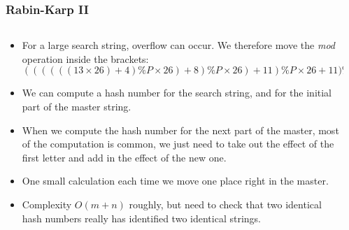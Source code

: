 \begin{frame}[fragile]
\frametitle{Rabin-Karp II}
\begin{columns}[T]

\begin{column}{0.530\textwidth}
\begin{itemize}[<+->]
\item For a large search string, overflow can occur. We therefore move the {\it mod} operation inside the brackets:
{\scriptsize
\[
((((((13\times26)+ 4)\%P \times26) + 8)\%P \times26) + 11)\%P \times26 + 11) \% P
\]
}
\item We can compute a hash number for the search string, and for the initial part of the master string.
\item When we compute the hash number for the next part of the master, most of the computation is common, we just need to take out the effect of the first letter and add in the effect of the new one.
\item One small calculation each time we move one place right in the master.
\item Complexity $O(m+n)$ roughly, but need to check that two identical hash numbers really has identified two identical strings.
\end{itemize}
\end{column}

\pause
\begin{column}{0.420\textwidth}

\end{column}

\end{columns}
\end{frame}


